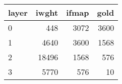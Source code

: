 \begin{tabular}{lrrr}
\toprule
layer &  iwght &  ifmap &  gold \\
\midrule
    0 &    448 &   3072 &  3600 \\
    1 &   4640 &   3600 &  1568 \\
    2 &  18496 &   1568 &   576 \\
    3 &   5770 &    576 &    10 \\
\bottomrule
\end{tabular}

